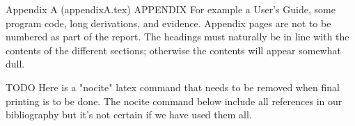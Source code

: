 Appendix A (appendixA.tex)
APPENDIX For example a User's Guide, some program code, long derivations, and
evidence. Appendix pages are not to be numbered as part of the report. The headings must
naturally be in line with the contents of the different sections; otherwise the contents will
appear somewhat dull.

TODO Here is a "nocite" latex command that needs to be removed when final printing is to be done. The nocite command below include all references in our bibliography but it's not certain if we have used them all.
\cite{fake}
\nocite{*}

